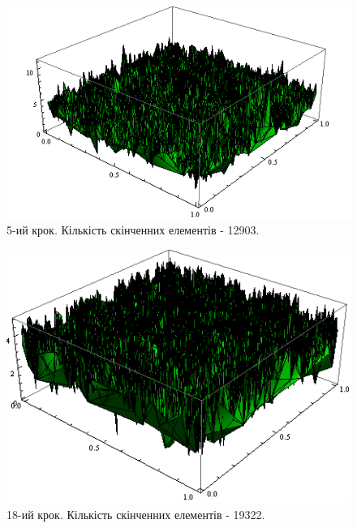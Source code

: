 \begin{figure}[H]
	\centering
    \includegraphics[scale=0.85]{problem1/my/AEE/5}
    \caption{5-ий крок. Кількість скінченних елементів - 12903.}
    \label{fig:p1_aee5}
\end{figure}

\begin{figure}[H]
	\centering
    \includegraphics[scale=0.85]{problem1/my/AEE/18}
    \caption{18-ий крок. Кількість скінченних елементів - 19322.}
    \label{fig:p1_aee18}
\end{figure}

